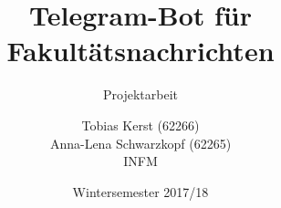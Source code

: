 \title{Telegram-Bot für Fakultätsnachrichten}%
\subtitle{Projektarbeit}
\author{%
	Tobias Kerst (62266) \\
  Anna-Lena Schwarzkopf (62265) \\
  INFM
}
\date{Wintersemester 2017/18}
\publishers{
    \textbf{Dozent:} Prof. Dr. rer. nat. Peter A. Henning
}
\maketitle

\clearpage
